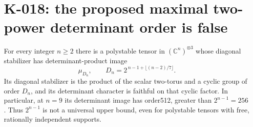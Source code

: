 \section{K-018: the proposed maximal two-power determinant order is false}
\label{sec:amplifying-gadget}

\begin{theorem}[K-018]
For every integer $n\ge2$ there is a polystable tensor in
$(\mathbb C^n)^{\otimes3}$ whose diagonal stabilizer has determinant-product
image
\[
       \mu_{D_n},\qquad
       D_n=2^{\,n-1+\lfloor(n-2)/7\rfloor}.
                                                               \tag{K-018a}
\]
Its diagonal stabilizer is the product of the scalar two-torus and
a cyclic group of order $D_n$, and its determinant character is
faithful on that cyclic factor.  In particular, at $n=9$ its
determinant image has order512, greater than $2^{n-1}=256$.
Thus $2^{n-1}$ is not a universal upper bound, even for polystable
tensors with free, rationally independent supports.
\end{theorem}

